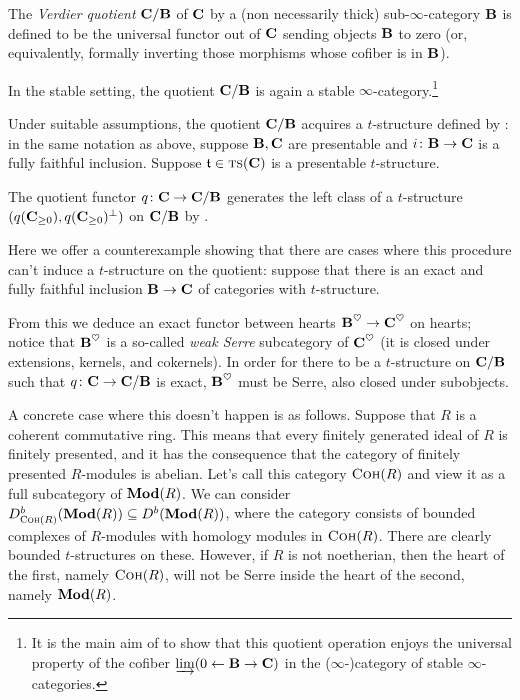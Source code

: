 \begin{definition}
The \emph{Verdier quotient} $\textbf{C}/\textbf{B}$ of $\textbf{C}$ by a (non necessarily thick) sub\hyp{}$\infty$\hyp{}category $\textbf{B}$ is defined to be the universal functor out of $\textbf{C}$ sending objects $\textbf{B}$ to zero (or, equivalently, formally inverting those morphisms whose cofiber is in $\textbf{B}$).

In the stable setting, the quotient $\textbf{C}/\textbf{B}$ is again a stable $\infty$\hyp{}category.\footnote{It is the main aim of \cite{} to show that this quotient operation enjoys the universal property of the cofiber $\varinjlim(0\leftarrow \textbf{B}\to \textbf{C})$ in the ($\infty$\hyp{})category of stable $\infty$\hyp{}categories.}

Under suitable assumptions, the quotient $\textbf{C}/\textbf{B}$ acquires a $t$\hyp{}structure defined by \cite[\aprop \textbf{1.4.4.11}]{LurieHA}: in the same notation as above, suppose $\textbf{B},\textbf{C}$ are presentable and $i\colon \textbf{B}\to \textbf{C}$ is a fully faithful inclusion. Suppose $\mathfrak{t}\in\text{\scshape ts}(\textbf{C})$ is a presentable $t$\hyp{}structure.

The quotient functor $q\colon \textbf{C} \to \textbf{C}/\textbf{B}$ generates the left class of a $t$\hyp{}structure $(q(\textbf{C}_{\ge 0}), q(\textbf{C}_{\ge 0})^\perp)$ on $\textbf{C}/\textbf{B}$ by \cite[\aprop \textbf{1.4.4.11}]{LurieHA}.
\end{definition}
\begin{remark}
Here we offer a counterexample \cite{237502} showing that there are cases where this procedure can't induce a $t$\hyp{}structure on the quotient: suppose that there is an exact and fully faithful inclusion $\textbf{B}\rightarrow \textbf{C}$ of categories with $t$\hyp{}structure.

From this we deduce an exact functor between hearts $\textbf{B}^\heartsuit\rightarrow \textbf{C}^\heartsuit$ on hearts; notice that $\textbf{B}^\heartsuit$ is a so\hyp{}called \emph{weak Serre} subcategory of $\textbf{C}^\heartsuit$ (it is closed under extensions, kernels, and cokernels). In order for there to be a $t$\hyp{}structure on $\textbf{C}/\textbf{B}$ such that $q\colon \textbf{C}\rightarrow \textbf{C}/\textbf{B}$ is exact, $\textbf{B}^\heartsuit$ must be Serre, \ie also closed under subobjects.

A concrete case where this doesn't happen is as follows. Suppose that $R$ is a coherent commutative ring. This means that every finitely generated ideal of $R$ is finitely presented, and it has the consequence that the category of finitely presented $R$\hyp{}modules is abelian. Let's call this category $\text{\scshape Coh}(R)$ and view it as a full subcategory of $\textbf{Mod}(R)$. We can consider $D^b_{\text{\scshape Coh}(R)}(\textbf{Mod}(R))\subseteq D^b(\textbf{Mod}(R))$, where the category consists of bounded complexes of $R$\hyp{}modules with homology modules in $\text{\scshape Coh}(R)$. There are clearly bounded $t$\hyp{}structures on these. However, if $R$ is not noetherian, then the heart of the first, namely $\text{\scshape Coh}(R)$, will not be Serre inside the heart of the second, namely $\textbf{Mod}(R)$.
\end{remark}
